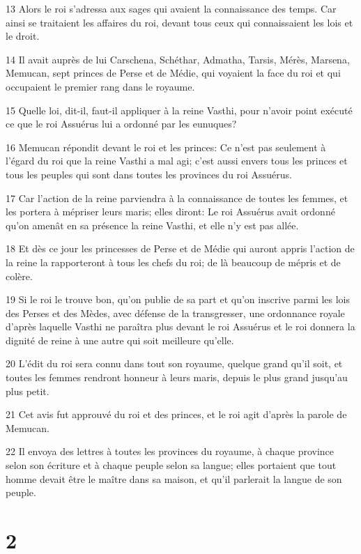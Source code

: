 \par 13 Alors le roi s'adressa aux sages qui avaient la connaissance des temps. Car ainsi se traitaient les affaires du roi, devant tous ceux qui connaissaient les lois et le droit.
\par 14 Il avait auprès de lui Carschena, Schéthar, Admatha, Tarsis, Mérès, Marsena, Memucan, sept princes de Perse et de Médie, qui voyaient la face du roi et qui occupaient le premier rang dans le royaume.
\par 15 Quelle loi, dit-il, faut-il appliquer à la reine Vasthi, pour n'avoir point exécuté ce que le roi Assuérus lui a ordonné par les eunuques?
\par 16 Memucan répondit devant le roi et les princes: Ce n'est pas seulement à l'égard du roi que la reine Vasthi a mal agi; c'est aussi envers tous les princes et tous les peuples qui sont dans toutes les provinces du roi Assuérus.
\par 17 Car l'action de la reine parviendra à la connaissance de toutes les femmes, et les portera à mépriser leurs maris; elles diront: Le roi Assuérus avait ordonné qu'on amenât en sa présence la reine Vasthi, et elle n'y est pas allée.
\par 18 Et dès ce jour les princesses de Perse et de Médie qui auront appris l'action de la reine la rapporteront à tous les chefs du roi; de là beaucoup de mépris et de colère.
\par 19 Si le roi le trouve bon, qu'on publie de sa part et qu'on inscrive parmi les lois des Perses et des Mèdes, avec défense de la transgresser, une ordonnance royale d'après laquelle Vasthi ne paraîtra plus devant le roi Assuérus et le roi donnera la dignité de reine à une autre qui soit meilleure qu'elle.
\par 20 L'édit du roi sera connu dans tout son royaume, quelque grand qu'il soit, et toutes les femmes rendront honneur à leurs maris, depuis le plus grand jusqu'au plus petit.
\par 21 Cet avis fut approuvé du roi et des princes, et le roi agit d'après la parole de Memucan.
\par 22 Il envoya des lettres à toutes les provinces du royaume, à chaque province selon son écriture et à chaque peuple selon sa langue; elles portaient que tout homme devait être le maître dans sa maison, et qu'il parlerait la langue de son peuple.

\chapter{2}

